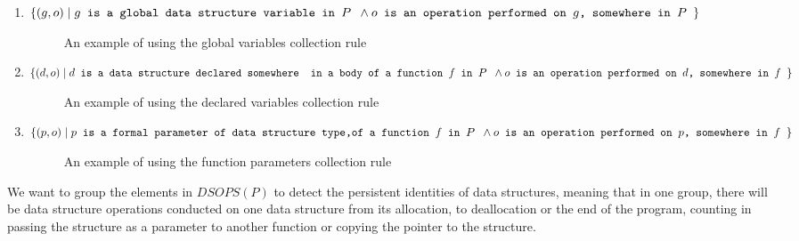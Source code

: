 \documentclass[a4paper,11pt]{article}
\begin{document}
		\begin{enumerate}

			\item \label{it:global} $\{(g, o)\; |\; g \texttt{ is a global data structure variable in $P$ }
				\wedge \\ o \texttt{ is an operation performed on $g$, somewhere in $P$ } \}$
				\begin{figure}
					

					\caption{An example of using the global variables collection rule}

					\label{fig:undecidable-no-user}
				\end{figure}

			\item \label{it:auto} $\{(d, o)\; |\; d \texttt{ is a data structure declared somewhere } \\
				\texttt{ in a body of a function $f$ in $P$ } \wedge \\ o \texttt{ is an operation
				performed on $d$, somewhere in $f$ } \}$
				\begin{figure}
					
					\caption{An example of using the declared variables collection rule}

					\label{fig:undecidable-no-user}
				\end{figure}

			\item \label{it:param} $\{(p, o)\; |\; p \texttt{ is a formal parameter of data structure type,}
				\\ \texttt{of a function $f$ in $P$ } \wedge \\ o \texttt{ is an operation performed on
				$p$, somewhere in $f$ } \}$
				\begin{figure}
					

					\caption{An example of using the function parameters collection rule}

					\label{fig:undecidable-no-user}
				\end{figure}

		\end{enumerate}


		We want to group the elements in $DSOPS(P)$ to detect the persistent identities \cite{Okasaki} of
		data structures, meaning that in one group, there will be data structure operations conducted on one
		data structure from its allocation, to deallocation or the end of the program, counting in passing the structure as a
		parameter to another function or copying the pointer to the structure.
\end{document}
